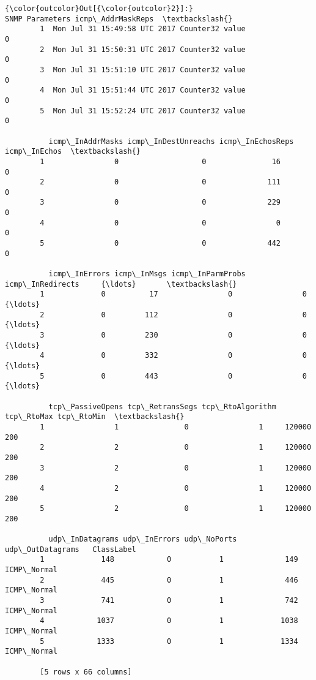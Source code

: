 \documentclass[11pt]{article}
\begin{document}
\begin{Verbatim}[commandchars=\\\{\}]
{\color{outcolor}Out[{\color{outcolor}2}]:}                                 SNMP Parameters icmp\_AddrMaskReps  \textbackslash{}
        1  Mon Jul 31 15:49:58 UTC 2017 Counter32 value                 0   
        2  Mon Jul 31 15:50:31 UTC 2017 Counter32 value                 0   
        3  Mon Jul 31 15:51:10 UTC 2017 Counter32 value                 0   
        4  Mon Jul 31 15:51:44 UTC 2017 Counter32 value                 0   
        5  Mon Jul 31 15:52:24 UTC 2017 Counter32 value                 0   
        
          icmp\_InAddrMasks icmp\_InDestUnreachs icmp\_InEchosReps icmp\_InEchos  \textbackslash{}
        1                0                   0               16            0   
        2                0                   0              111            0   
        3                0                   0              229            0   
        4                0                   0                0            0   
        5                0                   0              442            0   
        
          icmp\_InErrors icmp\_InMsgs icmp\_InParmProbs icmp\_InRedirects     {\ldots}       \textbackslash{}
        1             0          17                0                0     {\ldots}        
        2             0         112                0                0     {\ldots}        
        3             0         230                0                0     {\ldots}        
        4             0         332                0                0     {\ldots}        
        5             0         443                0                0     {\ldots}        
        
          tcp\_PassiveOpens tcp\_RetransSegs tcp\_RtoAlgorithm tcp\_RtoMax tcp\_RtoMin  \textbackslash{}
        1                1               0                1     120000        200   
        2                2               0                1     120000        200   
        3                2               0                1     120000        200   
        4                2               0                1     120000        200   
        5                2               0                1     120000        200   
        
          udp\_InDatagrams udp\_InErrors udp\_NoPorts udp\_OutDatagrams   ClassLabel  
        1             148            0           1              149  ICMP\_Normal  
        2             445            0           1              446  ICMP\_Normal  
        3             741            0           1              742  ICMP\_Normal  
        4            1037            0           1             1038  ICMP\_Normal  
        5            1333            0           1             1334  ICMP\_Normal  
        
        [5 rows x 66 columns]
\end{Verbatim}
            
\end{document}
